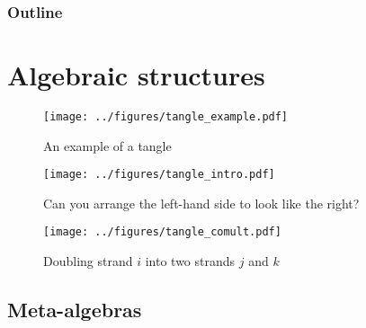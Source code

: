\documentclass{beamer}
\title{\myTitle}
\author{\myName}
\date{\myTime}
\institute{\myUni~\\\myDepartment}
\begin{document}
\begin{frame}
        \titlepage
\end{frame}

\begin{frame}
        \frametitle{Outline}
        \tableofcontents
\end{frame}
\section{Algebraic structures}

\begin{frame}
\begin{figure}
        \centering
        \texttt{[image: ../figures/tangle\_example.pdf]}
        \caption{An example of a tangle}
        \label{fig:tangle_example}
\end{figure}
\end{frame}

\begin{frame}
\begin{figure}
        \centering
        \texttt{[image: ../figures/tangle\_intro.pdf]}
        \caption{Can you arrange the left-hand side to look like the right?}
        \label{fig:tangle_intro}
\end{figure}
\end{frame}

\begin{frame}
\begin{figure}
        \centering
        \texttt{[image: ../figures/tangle\_comult.pdf]}
        \caption{Doubling strand $i$ into two strands $j$ and $k$}
        \label{fig:tangle_comult}
\end{figure}
\end{frame}

\subsection{Meta-algebras}
\end{document}
